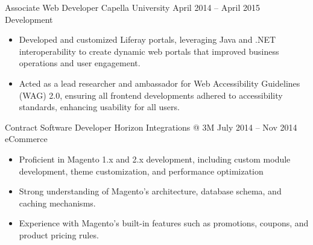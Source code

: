 \medskip
\cvexperience
{Associate Web Developer}
{Capella University}
{April 2014 – April 2015}
{Development}
{\footnotesize\faCode \hspace{1pt}       }
\begin{itemize}
    \item Developed and customized Liferay portals, leveraging Java and .NET interoperability to create dynamic web portals that improved business operations and user engagement.
    \item Acted as a lead researcher and ambassador for Web Accessibility Guidelines (WAG) 2.0, ensuring all frontend developments adhered to accessibility standards, enhancing usability for all users.
\end{itemize}

\medskip

\cvexperience
{Contract Software Developer}
{Horizon Integrations @ 3M}
{July 2014 – Nov 2014}
{eCommerce}
{\footnotesize\faCode \hspace{1pt}    }
\begin{itemize}
    \item Proficient in Magento 1.x and 2.x development, including custom module development, theme customization, and performance optimization
    \item Strong understanding of Magento's architecture, database schema, and caching mechanisms.
    \item Experience with Magento's built-in features such as promotions, coupons, and product pricing rules.
\end{itemize}

